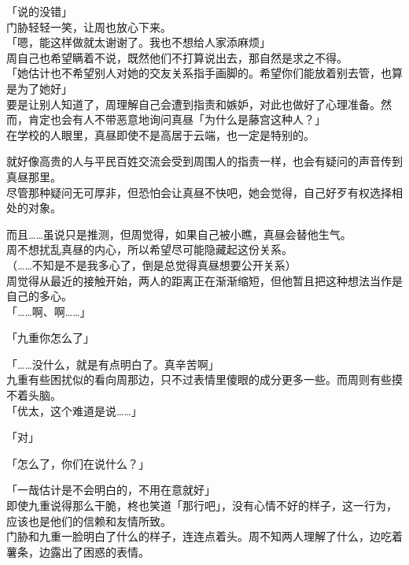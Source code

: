 「说的没错」\\

门胁轻轻一笑，让周也放心下来。\\

「嗯，能这样做就太谢谢了。我也不想给人家添麻烦」\\

周自己也希望瞒着不说，既然他们不打算说出去，那自然是求之不得。\\

「她估计也不希望别人对她的交友关系指手画脚的。希望你们能放着别去管，也算是为了她好」\\

要是让别人知道了，周理解自己会遭到指责和嫉妒，对此也做好了心理准备。然而，肯定也会有人不带恶意地询问真昼「为什么是藤宫这种人？」\\

在学校的人眼里，真昼即使不是高居于云端，也一定是特别的。

就好像高贵的人与平民百姓交流会受到周围人的指责一样，也会有疑问的声音传到真昼那里。\\

尽管那种疑问无可厚非，但恐怕会让真昼不快吧，她会觉得，自己好歹有权选择相处的对象。

而且……虽说只是推测，但周觉得，如果自己被小瞧，真昼会替他生气。\\

周不想扰乱真昼的内心，所以希望尽可能隐藏起这份关系。\\

（……不知是不是我多心了，倒是总觉得真昼想要公开关系）\\

周觉得从最近的接触开始，两人的距离正在渐渐缩短，但他暂且把这种想法当作是自己的多心。\\

「……啊、啊……」

「九重你怎么了」

「……没什么，就是有点明白了。真辛苦啊」\\

九重有些困扰似的看向周那边，只不过表情里傻眼的成分更多一些。而周则有些摸不着头脑。\\

「优太，这个难道是说……」

「对」

「怎么了，你们在说什么？」

「一哉估计是不会明白的，不用在意就好」\\

即使九重说得那么干脆，柊也笑道「那行吧」，没有心情不好的样子，这一行为，应该也是他们的信赖和友情所致。\\

门胁和九重一脸明白了什么的样子，连连点着头。周不知两人理解了什么，边吃着薯条，边露出了困惑的表情。

